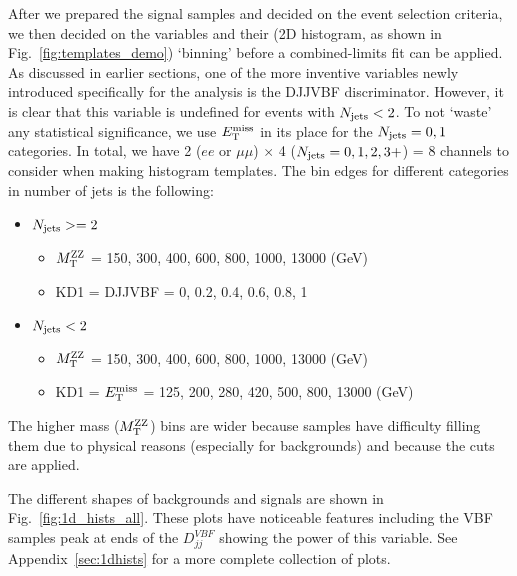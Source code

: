 After we prepared the signal samples and decided on the event selection criteria, we then
decided on the variables and their (2D histogram, as shown in Fig.~\ref{fig:templates_demo}) `binning' before a combined-limits
fit can be applied. As discussed in earlier sections, one of the more inventive variables
newly introduced specifically for the analysis is the DJJVBF discriminator. However, it is
clear that this variable is undefined for events with $N_\mathrm{jets} < 2$. To
not `waste' any statistical significance, we use $E_{\mathrm{T}}^{\mathrm{miss}}$ in its place for the
$N_\mathrm{jets} = 0,1$ categories. In total, we have 2 ($ee$ or $\mu\mu$) $\times$ 4 ($N_\mathrm{jets} = 0,1,2,3+$) = 8
channels to consider when making histogram templates.
The bin edges for different categories in number of jets is the following:
\begin{itemize} 
    \item $N_\mathrm{jets} >= 2$
        \begin{itemize} 
            \item $M_\mathrm{T}^{\mathrm{ZZ}}$ = 150, 300, 400, 600, 800, 1000, 13000 (GeV)
            \item KD1 = DJJVBF = 0, 0.2, 0.4, 0.6, 0.8, 1
        \end{itemize}
    \item $N_\mathrm{jets} < 2$
        \begin{itemize} 
            \item $M_\mathrm{T}^{\mathrm{ZZ}}$ = 150, 300, 400, 600, 800, 1000, 13000 (GeV)
            \item KD1 = $E_{\mathrm{T}}^{\mathrm{miss}}$ = 125, 200, 280, 420, 500, 800, 13000 (GeV)
        \end{itemize}
\end{itemize}
The higher mass ($M_\mathrm{T}^{\mathrm{ZZ}}$) bins are wider because samples
have difficulty filling them due to physical reasons (especially for backgrounds) 
and because the cuts are applied. 

The different shapes of backgrounds and signals are shown in Fig.~\ref{fig:1d_hists_all}. These plots have noticeable features
including the VBF samples peak at ends of the $D_{j j}^{V B F}$ showing the power of this variable. 
See Appendix~\ref{sec:1dhists}
for a more complete collection of plots.

